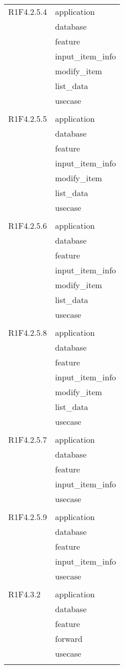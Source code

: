 \begin{center}
\begin{longtable}{|p{7cm}|p{5cm}|}
		R1F4.2.5.4 & application \\ & database \\ & feature \\ & input\_item\_info \\ & modify\_item \\ & list\_data \\ & usecase \\ & \\ \hline
		R1F4.2.5.5 & application \\ & database \\ & feature \\ & input\_item\_info \\ & modify\_item \\ & list\_data \\ & usecase \\ & \\ \hline
		R1F4.2.5.6 & application \\ & database \\ & feature \\ & input\_item\_info \\ & modify\_item \\ & list\_data \\ & usecase \\ & \\ \hline
		R1F4.2.5.8 & application \\ & database \\ & feature \\ & input\_item\_info \\ & modify\_item \\ & list\_data \\ & usecase \\ & \\ \hline
		R1F4.2.5.7 & application \\ & database \\ & feature \\ & input\_item\_info \\ & usecase \\ & \\ \hline
		R1F4.2.5.9 & application \\ & database \\ & feature \\ & input\_item\_info \\ & usecase \\ & \\ \hline
		R1F4.3.2 & application \\ & database \\ & feature \\ & forward \\ & usecase \\ & \\ \hline

\end{longtable}
\end{center}
